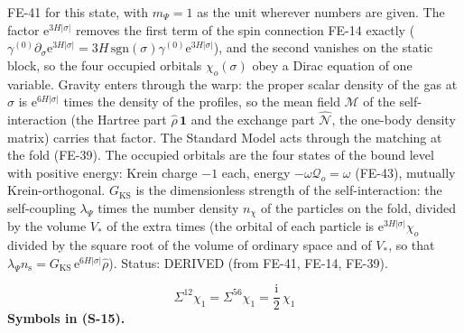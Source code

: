 \documentclass[
  10pt,
]{article}
\begin{document}
FE-41 for this state, with \(m_\Psi = 1\) as the unit wherever numbers
are given. The factor \(\mathrm{e}^{3H\lvert\sigma\rvert}\) removes the
first term of the spin connection FE-14 exactly
(\(\gamma^{(0)}\partial_\sigma\mathrm{e}^{3H\lvert\sigma\rvert} = 3H\,\mathrm{sgn}(\sigma)\gamma^{(0)}\mathrm{e}^{3H\lvert\sigma\rvert}\)),
and the second vanishes on the static block, so the four occupied
orbitals \(\chi_o(\sigma)\) obey a Dirac equation of one variable.
Gravity enters through the warp: the proper scalar density of the gas at
\(\sigma\) is \(\mathrm{e}^{6H\lvert\sigma\rvert}\) times the density of
the profiles, so the mean field \(\mathcal{M}\) of the self-interaction
(the Hartree part \(\hat\rho\,\mathbf{1}\) and the exchange part
\(\hat{\mathcal{N}}\), the one-body density matrix) carries that factor.
The Standard Model acts through the matching at the fold (FE-39). The
occupied orbitals are the four states of the bound level with positive
energy: Krein charge \(-1\) each, energy
\(-\omega\mathcal{Q}_o = \omega\) (FE-43), mutually Krein-orthogonal.
\(G_{\mathrm{KS}}\) is the dimensionless strength of the
self-interaction: the self-coupling \(\lambda_\Psi\) times the number
density \(n_\chi\) of the particles on the fold, divided by the volume
\(V_*\) of the extra times (the orbital of each particle is
\(\mathrm{e}^{3H\lvert\sigma\rvert}\chi_o\) divided by the square root
of the volume of ordinary space and of \(V_*\), so that
\(\lambda_\Psi n_{\mathrm{s}} = G_{\mathrm{KS}}\,\mathrm{e}^{6H\lvert\sigma\rvert}\hat\rho\)).
Status: DERIVED (from FE-41, FE-14, FE-39).

\[
\Sigma^{12}\chi_1 = \Sigma^{56}\chi_1 = \frac{\mathrm{i}}{2}\,\chi_1 \tag{S-15}
\] \textbf{Symbols in (S-15).}
\end{document}
